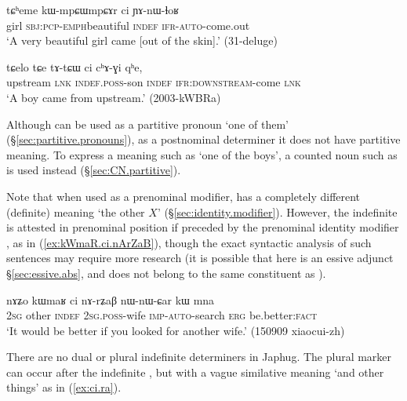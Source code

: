 \begin{exe}
\ex \label{ex:ci.indef}
\gll tɕʰeme kɯ-mpɕɯ\redp{}mpɕɤr ci ɲɤ-nɯ-ɬoʁ \\
girl \textsc{sbj}:\textsc{pcp}-\textsc{emph}\redp{}beautiful \textsc{indef} \textsc{ifr}-\textsc{auto}-come.out \\
\glt `A very beautiful girl came [out of the skin].' (31-deluge) 
\end{exe}

\begin{exe}
\ex \label{ex:ci.chAGi}
\gll tɕelo tɕe tɤ-tɕɯ ci cʰɤ-ɣi qʰe, \\
upstream \textsc{lnk} \textsc{indef}.\textsc{poss}-son \textsc{indef} \textsc{ifr}:\textsc{downstream}-come \textsc{lnk} \\
\glt `A boy came from upstream.' (2003-kWBRa)
\end{exe}

Although  can be used as a partitive pronoun `one of them' (§\ref{sec:partitive.pronouns}), as a postnominal determiner it does not have partitive meaning. To express a meaning such as `one of the boys', a counted noun such as  is used instead (§\ref{sec:CN.partitive}). 

Note that when used as a prenominal modifier,  has a completely different (definite) meaning `the other $X$' (§\ref{sec:identity.modifier}). However, the indefinite  is attested in prenominal position if preceded by the prenominal identity modifier , as in (\ref{ex:kWmaR.ci.nArZaB}), though the exact syntactic analysis of such sentences may require more research (it is possible that  here is an essive adjunct §\ref{sec:essive.abs}, and does not belong to the same constituent as ).

\begin{exe}
\ex \label{ex:kWmaR.ci.nArZaB}
\gll  nɤʑo kɯmaʁ ci nɤ-rʑaβ nɯ-nɯ-ɕar kɯ mna  \\
\textsc{2sg} other \textsc{indef} \textsc{2sg}.\textsc{poss}-wife \textsc{imp}-\textsc{auto}-search \textsc{erg} be.better:\textsc{fact} \\
\glt `It would be better if you looked for another wife.' (150909 xiaocui-zh)
\end{exe}

There are no dual or plural indefinite determiners in Japhug. The plural marker  can occur after the indefinite , but with a vague similative meaning `and other things' as in (\ref{ex:ci.ra}).

